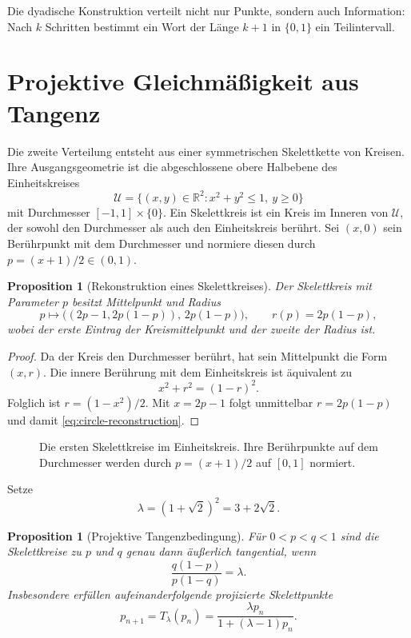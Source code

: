 \documentclass[11pt,a4paper]{article}
\newtheorem{proposition}[remark]{Proposition}
\begin{document}
Die dyadische Konstruktion verteilt nicht nur Punkte, sondern auch
Information: Nach $k$ Schritten bestimmt ein Wort der Länge $k+1$ in
$\{0,1\}$ ein Teilintervall.

\section{Projektive Gleichmäßigkeit aus Tangenz}

Die zweite Verteilung entsteht aus einer symmetrischen Skelettkette von
Kreisen. Ihre Ausgangsgeometrie ist die abgeschlossene obere Halbebene des
Einheitskreises
\[
 \mathcal U=\{(x,y)\in\mathbb R^2:x^2+y^2\le1,\ y\ge0\}
\]
mit Durchmesser $[-1,1]\times\{0\}$. Ein Skelettkreis ist ein Kreis im
Inneren von $\mathcal U$, der sowohl den Durchmesser als auch den
Einheitskreis berührt. Sei $(x,0)$ sein Berührpunkt mit dem Durchmesser und
normiere diesen durch $p=(x+1)/2\in(0,1)$.

\begin{proposition}[Rekonstruktion eines Skelettkreises]
Der Skelettkreis mit Parameter $p$ besitzt Mittelpunkt und Radius
\begin{equation}\label{eq:circle-reconstruction}
 p\longmapsto \bigl((2p-1,2p(1-p)),\,2p(1-p)\bigr),
 \qquad r(p)=2p(1-p),
\end{equation}
wobei der erste Eintrag der Kreismittelpunkt und der zweite der Radius ist.
\end{proposition}

\begin{proof}
Da der Kreis den Durchmesser berührt, hat sein Mittelpunkt die Form $(x,r)$.
Die innere Berührung mit dem Einheitskreis ist äquivalent zu
\[
 x^2+r^2=(1-r)^2.
\]
Folglich ist $r=(1-x^2)/2$. Mit $x=2p-1$ folgt unmittelbar
$r=2p(1-p)$ und damit \eqref{eq:circle-reconstruction}.
\end{proof}

\begin{figure}[htbp]
 \centering
 
 \caption{Die ersten Skelettkreise im Einheitskreis. Ihre Berührpunkte auf
 dem Durchmesser werden durch $p=(x+1)/2$ auf $[0,1]$ normiert.}
 \label{fig:skeleton-projection}
\end{figure}

Setze
\[
 \lambda=(1+\sqrt2)^2=3+2\sqrt2.
\]
\begin{proposition}[Projektive Tangenzbedingung]
Für $0<p<q<1$ sind die Skelettkreise zu $p$ und $q$ genau dann äußerlich
tangential, wenn
\begin{equation}\label{eq:crossratio}
 \frac{q(1-p)}{p(1-q)}=\lambda.
\end{equation}
Insbesondere erfüllen aufeinanderfolgende projizierte Skelettpunkte
\begin{equation}\label{eq:mobius}
 p_{n+1}=T_\lambda(p_n)
 =\frac{\lambda p_n}{1+(\lambda-1)p_n}.
\end{equation}
\end{proposition}
\end{document}
